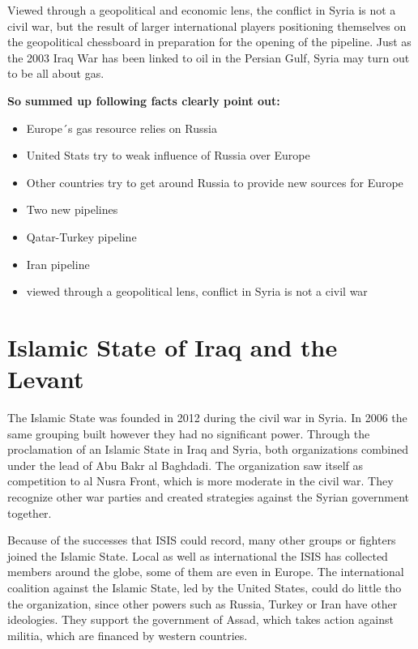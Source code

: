 Viewed through a geopolitical and economic lens, the conflict in Syria is not a civil war, but the result of larger international players positioning themselves on the geopolitical chessboard in preparation for the opening of the pipeline.
Just as the 2003 Iraq War has been linked to oil in the Persian Gulf, Syria may turn out to be all about gas.\newline

\textbf{So summed up following facts clearly point out:}
\begin{itemize}
	\item Europe´s gas resource relies on Russia
	\item United Stats try to weak influence of Russia over Europe
	\item Other countries try to get around Russia to provide new sources for Europe
	\item Two new pipelines
	\item Qatar-Turkey pipeline
	\item Iran pipeline
	\item viewed through a geopolitical lens, conflict in Syria is not a civil war
	
\end{itemize}


\section{Islamic State of Iraq and the Levant}
The Islamic State was founded in 2012 during the civil war in Syria. In 2006 the same grouping built however they had no significant power. Through the proclamation of an Islamic State in Iraq and Syria, both organizations combined under the lead of Abu Bakr al Baghdadi. The organization saw itself as competition to al Nusra Front, which is more moderate in the civil war. They recognize other war parties and created strategies against the Syrian government together.

Because of the successes that ISIS could record, many other groups or fighters joined the Islamic State. Local as well as international the ISIS has collected members around the globe, some of them are even in Europe. The international coalition against the Islamic State, led by the United States, could do little tho the organization, since other powers such as Russia, Turkey or Iran have other ideologies. They support the government of Assad, which takes action against militia, which are financed by western countries.

